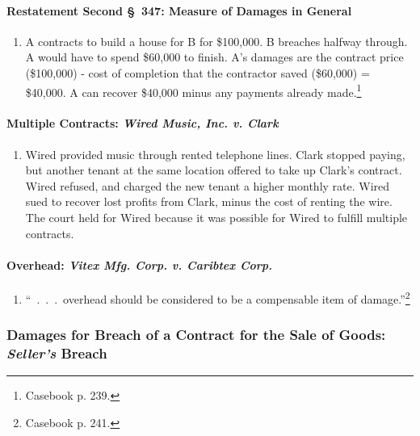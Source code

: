 \paragraph{Restatement Second \S\ 347: Measure of Damages in General}

\begin{enumerate}
    \item A contracts to build a house for B for \$100,000. B breaches 
    halfway through. A would have to spend \$60,000 to finish. A's damages are 
    the contract price (\$100,000) - cost of completion that the contractor 
    saved (\$60,000) = \$40,000. A can recover \$40,000 minus any payments 
    already made.\footnote{Casebook p. 239.}
\end{enumerate}

\paragraph{Multiple Contracts: \emph{Wired Music, Inc. v. Clark}}

\begin{enumerate}
    \item Wired provided music through rented telephone lines. Clark stopped 
    paying, but another tenant at the same location offered to take up Clark's 
    contract. Wired refused, and charged the new tenant a higher monthly rate. 
    Wired sued to recover lost profits from Clark, minus the cost of renting 
    the wire. The court held for Wired because it was possible for Wired to 
    fulfill multiple contracts.
\end{enumerate}

\paragraph{Overhead: \emph{Vitex Mfg. Corp. v. Caribtex Corp.}}

\begin{enumerate}
    \item ``~.~.~.~overhead should be considered to be a compensable item of 
    damage.''\footnote{Casebook p. 241.}
\end{enumerate}

\subsubsection{Damages for Breach of a Contract for the Sale of Goods: 
\emph{Seller's} Breach}

